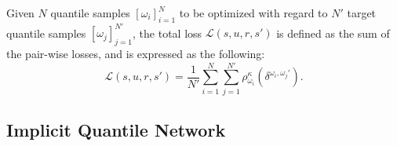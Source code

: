 \documentclass[twoside,11pt]{article}
\newcommand{\state}{s}
\newcommand{\action}{u}
\newcommand{\reward}{r}
\newcommand{\tderror}{\delta}
\newcommand{\asymmetrichuberloss}{\rho}
\newcommand{\loss}{\mathcal{L}}
\newcommand{\quantile}{\omega}
\newcommand{\numberofquantiles}{N}
\newcommand{\numberofquantilesamples}{N'}
\begin{document}
Given $\numberofquantiles{}$ quantile samples $[\quantile{}_i]_{i=1}^{\numberofquantiles}$ to be optimized with regard to $\numberofquantilesamples$  target quantile samples $[\quantile{}_j]_{j=1}^{\numberofquantilesamples}$, the total loss $\loss{}(\state{},\action{},\reward{},\state{}')$  is defined as the sum of the pair-wise losses, and is expressed as the following:
\begin{equation}
\loss{}(\state{},\action{},\reward{},\state{}')=\frac{1}{\numberofquantilesamples{}}\sum_{i=1}^{\numberofquantiles{}}\sum_{j=1}^{\numberofquantilesamples{}}\asymmetrichuberloss{}^\kappa_{\quantile{}_i}(\tderror^{\quantile{}_i,\quantile{}_j'}).
\label{eq:total_qr_loss}
\end{equation}



\subsection{Implicit Quantile Network}
\label{subsec:background_implicit_quantile_network}
\end{document}

